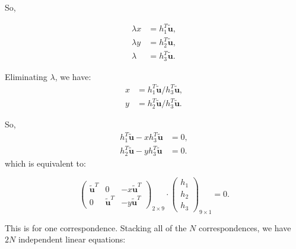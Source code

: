 \documentclass[
  course = {{16-720B Computer Vision}},
  quartile = {{1}},
  assignment = 4\ -\ Feature\ Descriptors\ \&\ Homographies\ \& \  RANSAC,
  name = {{Kangle Deng}},
  email = {{kangled@andrew.cmu.edu}},
  firstexercise = 1
]{aga-homework}
\begin{document}
So,

\begin{equation*}
    \begin{aligned}
        \lambda x & = h_1^T \tilde{\mathbf{u}}, \\
        \lambda y & = h_2^T \tilde{\mathbf{u}}, \\
        \lambda & = h_3^T \tilde{\mathbf{u}}.
    \end{aligned}
\end{equation*}

Eliminating $\lambda$, we have:
\begin{equation*}
    \begin{aligned}
        x & = h_1^T \tilde{\mathbf{u}} /  h_3^T \tilde{\mathbf{u}}, \\
        y & = h_2^T \tilde{\mathbf{u}} /  h_3^T \tilde{\mathbf{u}}.
    \end{aligned}
\end{equation*}

So,
\begin{equation*}
    \begin{aligned}
        h_1^T \tilde{\mathbf{u}} - x h_3^T \tilde{\mathbf{u}} & = 0 , \\
        h_2^T \tilde{\mathbf{u}} - y h_3^T \tilde{\mathbf{u}} & = 0.
    \end{aligned}
\end{equation*}
which is equivalent to:

\begin{equation*}
    \left(
    \begin{array}{ccc}
       \tilde{\mathbf{u}}^T  & 0 & -x\tilde{\mathbf{u}}^T \\
       0  & \tilde{\mathbf{u}}^T & -y\tilde{\mathbf{u}}^T
    \end{array}
    \right)_{2 \times 9} \cdot \left(
    \begin{array}{c}
         h_1  \\
         h_2 \\
         h_3
    \end{array}
    \right)_{9 \times 1} = 0.
\end{equation*}

This is for one correspondence. Stacking all of the $N$ correspondences, we have $2N$ independent linear equations:
\end{document}

